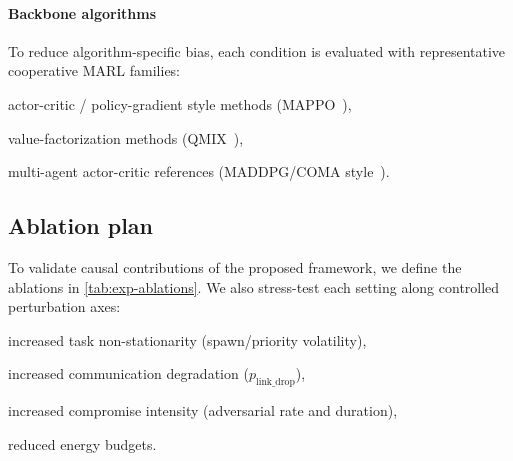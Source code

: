 \documentclass[sigconf]{aamas}
\begin{document}
\paragraph{Backbone algorithms}
To reduce algorithm-specific bias, each condition is evaluated with representative cooperative MARL families:
\begin{enumerate*}[label={\roman*) },itemjoin={; \quad}]
    \item actor-critic / policy-gradient style methods (MAPPO~\cite{yu2021mappo}),
    \item value-factorization methods (QMIX~\cite{rashid2018qmix}),
    \item multi-agent actor-critic references (MADDPG/COMA style~\cite{lowe2017multi,foerster2018counterfactual}).
\end{enumerate*}

\subsection{Ablation plan}
To validate causal contributions of the proposed framework, we define the ablations in \autoref{tab:exp-ablations}. We also stress-test each setting along controlled perturbation axes:
\begin{enumerate*}[label={\roman*) },itemjoin={; \quad}]
    \item increased task non-stationarity (spawn/priority volatility),
    \item increased communication degradation ($p_{\text{link\_drop}}$),
    \item increased compromise intensity (adversarial rate and duration),
    \item reduced energy budgets.
\end{enumerate*}
\end{document}
